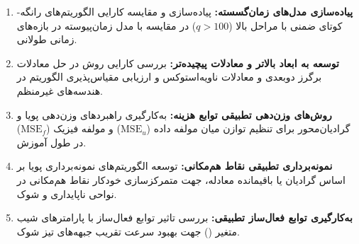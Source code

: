 \begin{enumerate}
\item \textbf{پیاده‌سازی مدل‌های زمان‌گسسته:} پیاده‌سازی و مقایسه کارایی الگوریتم‌های رانگه-کوتای ضمنی با مراحل بالا ($q > 100$) در مقایسه با مدل زمان‌پیوسته در بازه‌های زمانی طولانی.
\item \textbf{توسعه به ابعاد بالاتر و معادلات پیچیده‌تر:} بررسی کارایی روش در حل معادلات برگرز دو‌بعدی و معادلات ناویه‌استوکس و ارزیابی مقیاس‌پذیری الگوریتم در هندسه‌های غیرمنظم.
\item \textbf{روش‌های وزن‌دهی تطبیقی توابع هزینه:} به‌کارگیری راهبردهای وزن‌دهی پویا و گرادیان‌محور برای تنظیم توازن میان مولفه داده ($\mathrm{MSE}_u$) و مولفه فیزیک ($\mathrm{MSE}_f$) در طول آموزش.
\item \textbf{نمونه‌برداری تطبیقی نقاط هم‌مکانی:} توسعه الگوریتم‌های نمونه‌برداری پویا بر اساس گرادیان یا باقیمانده معادله، جهت متمرکزسازی خودکار نقاط هم‌مکانی در نواحی ناپایداری و شوک.
\item \textbf{به‌کارگیری توابع فعال‌ساز تطبیقی:} بررسی تاثیر توابع فعال‌ساز با پارامترهای شیب متغیر () جهت بهبود سرعت تقریب جبهه‌های تیز شوک.
\end{enumerate}
